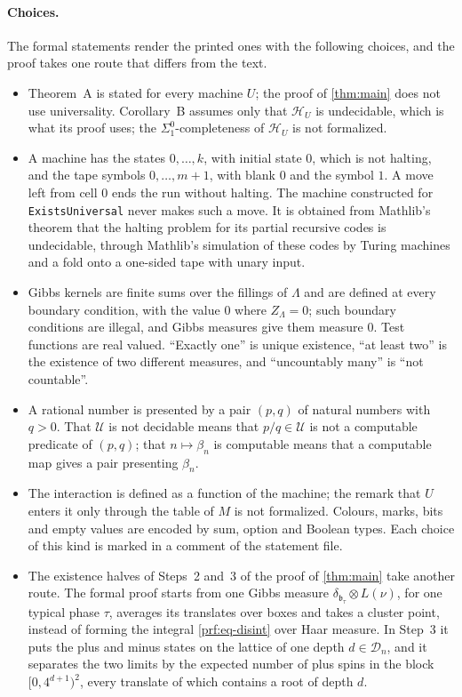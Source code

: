 \paragraph{Choices.} The formal statements render the printed ones with the following choices, and the proof takes one route that differs from the text.
\begin{itemize}
\item Theorem~A is stated for every machine $U$; the proof of \cref{thm:main} does not use universality. Corollary~B assumes only that $\mathcal H_U$ is undecidable, which is what its proof uses; the $\Sigma^0_1$-completeness of $\mathcal H_U$ is not formalized.
\item A machine has the states $0,\dots,k$, with initial state $0$, which is not halting, and the tape symbols $0,\dots,m+1$, with blank $0$ and the symbol $1$. A move left from cell $0$ ends the run without halting. The machine constructed for \texttt{ExistsUniversal} never makes such a move. It is obtained from Mathlib's theorem that the halting problem for its partial recursive codes is undecidable, through Mathlib's simulation of these codes by Turing machines and a fold onto a one-sided tape with unary input.
\item Gibbs kernels are finite sums over the fillings of $\Lambda$ and are defined at every boundary condition, with the value $0$ where $Z_\Lambda=0$; such boundary conditions are illegal, and Gibbs measures give them measure $0$. Test functions are real valued. ``Exactly one'' is unique existence, ``at least two'' is the existence of two different measures, and ``uncountably many'' is ``not countable''.
\item A rational number is presented by a pair $(p,q)$ of natural numbers with $q>0$. That $\mathcal U$ is not decidable means that $p/q\in\mathcal U$ is not a computable predicate of $(p,q)$; that $n\mapsto\beta_n$ is computable means that a computable map gives a pair presenting $\beta_n$.
\item The interaction is defined as a function of the machine; the remark that $U$ enters it only through the table of $M$ is not formalized. Colours, marks, bits and empty values are encoded by sum, option and Boolean types. Each choice of this kind is marked in a comment of the statement file.
\item The existence halves of Steps~2 and~3 of the proof of \cref{thm:main} take another route. The formal proof starts from one Gibbs measure $\delta_{\mathfrak b_\tau}\otimes L(\nu)$, for one typical phase $\tau$, averages its translates over boxes and takes a cluster point, instead of forming the integral \eqref{prf:eq-disint} over Haar measure. In Step~3 it puts the plus and minus states on the lattice of one depth $d\in\mathcal D_n$, and it separates the two limits by the expected number of plus spins in the block $[0,4^{d+1})^2$, every translate of which contains a root of depth $d$.
\end{itemize}

